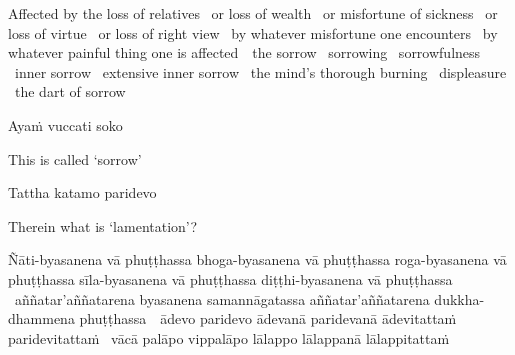 \begin{english-hang-verses}
  Affected by the loss of relatives \breathmark\ or loss of wealth \breathmark\ or misfortune of sickness \breathmark\ or loss of virtue \breathmark\ or loss of right view\makeatletter\hyperlink{endnote84-appendix}\makeatother
  \breathmark\ by whatever misfortune one encounters \breathmark\ by whatever painful thing one is \mbox{affected}~\breathmark\ the sorrow \breathmark\ sorrowing \breathmark\ sorrowfulness \breathmark\ inner sorrow \breathmark\ extensive inner sorrow \breathmark\ the mind's thorough burning \breathmark\ displeasure \breathmark\ the dart of sorrow
\end{english-hang-verses}

\ifninebythirteenversion\clearpage\fi

Ayaṁ vuccati soko

\begin{english}
  This is called `sorrow'
\end{english}

Tattha katamo paridevo

\begin{english}
  Therein what is `lamentation'?
\end{english}

\begin{pali-hang}
  Ñāti-byasanena vā phuṭṭhassa bhoga-byasanena vā phuṭṭhassa roga-byasanena vā phuṭṭhassa sīla-byasanena vā phuṭṭhassa diṭṭhi-byasanena vā phuṭṭhassa \breathmark\ aññatar'aññatarena byasanena samannāgatassa aññatar'aññatarena dukkha-dhammena \mbox{phuṭṭhassa}~\breathmark\ ādevo paridevo ādevanā paridevanā ādevitattaṁ paridevitattaṁ \breathmark\ vācā palāpo vippalāpo lālappo lālappanā lālappitattaṁ
\end{pali-hang}


